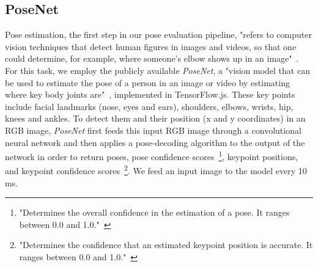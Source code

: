 \subsection*{PoseNet}
Pose estimation, the first step in our pose evaluation pipeline, "refers to computer vision techniques that detect human figures in images and videos, so that one could determine, for example, where someone’s elbow shows up in an image"~\cite{tflite_pose_estimation}. For this task, we employ the publicly available \textit{PoseNet}, a "vision model that can be used to estimate the pose of a person in an image or video by estimating where key body joints are"~\cite{tflite_pose_estimation}, implemented in TensorFlow.js. These key points include facial landmarks (nose, eyes and ears), shoulders, elbows, wrists, hip, knees and ankles. To detect them and their position (x and y coordinates) in an RGB image, \textit{PoseNet} first feeds this input RGB image through a convolutional neural network and then applies a pose-decoding algorithm to the output of the network in order to return poses, pose confidence scores~\footnote{"Determines the overall confidence in the estimation of a pose. It ranges between 0.0 and 1.0."~\cite{tf_js_pose_estimation}}, keypoint positions, and keypoint confidence scores~\footnote{"Determines the confidence that an estimated keypoint position is accurate. It ranges between 0.0 and 1.0."~\cite{tf_js_pose_estimation}}. We feed an input image to the model every 10 ms.

